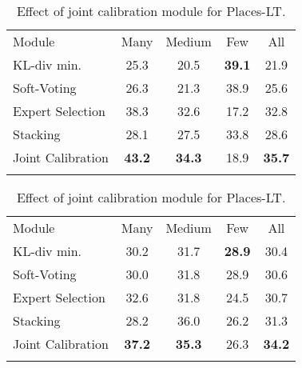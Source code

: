 \documentclass[runningheads]{llncs}
\begin{document}
\begin{table}[!]
\parbox{.45\linewidth}{
\caption{Effect of joint calibration module for ImageNet-LT.}
\begin{tabular}{ l | c c c | c }
    \Xhline{4\arrayrulewidth}
    Module & Many & Medium & Few & All \\       \Xhline{4\arrayrulewidth}
    KL-div min. & 25.3 & 20.5 & \textbf{39.1} & 21.9 \\ 
    Soft-Voting & 26.3 & 21.3 & 38.9 & 25.6 \\
    Expert Selection & 38.3 & 32.6 & 17.2 & 32.8 \\
    Stacking & 28.1 & 27.5 & 33.8 & 28.6 \\
    Joint Calibration & \textbf{43.2} & \textbf{34.3} & 18.9 & \textbf{35.7} \\  \Xhline{4\arrayrulewidth}
\end{tabular}
\label{tab:imagenet_joint}
}
\hspace{3em}
\parbox{.45\linewidth}{
\caption{Effect of joint calibration module for Places-LT. }
\begin{tabular}{ l | c c c | c }
     \Xhline{4\arrayrulewidth}
    Module & Many & Medium & Few & All \\       \Xhline{4\arrayrulewidth}
    KL-div min. & 30.2 & 31.7 & \textbf{28.9} & 30.4 \\
    Soft-Voting & 30.0 & 31.8 & 28.9 & 30.6 \\
    Expert Selection & 32.6 & 31.8 & 24.5 & 30.7 \\
    Stacking & 28.2 & 36.0 & 26.2 & 31.3 \\
    Joint Calibration & \textbf{37.2} & \textbf{35.3} & 26.3 & \textbf{34.2}  \\  \Xhline{4\arrayrulewidth}
\end{tabular}
\label{tab:places_joint}
}
\end{table}
\end{document}
